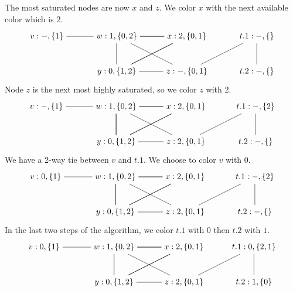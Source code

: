 \documentclass[11pt]{book}
\begin{document}
The most saturated nodes are now $x$ and $z$. We color $x$ with the
next available color which is $2$.
\[
\begin{tikzpicture}[baseline=(current  bounding  box.center)]
\node (v) at (0,0)    {$v:-,\{1\}$};
\node (w) at (3,0)    {$w:1,\{0,2\}$};
\node (x) at (6,0)    {$x:2,\{0,1\}$};
\node (y) at (3,-1.5) {$y:0,\{1,2\}$};
\node (z) at (6,-1.5) {$z:-,\{0,1\}$};
\node (t1) at (9,0)   {$t.1:-,\{\}$};
\node (t2) at (9,-1.5) {$t.2:-,\{\}$};
\draw (t1) to (z);
\draw (t2) to (t1);
\draw (v) to (w);
\foreach \i in {w,x,y}
{
  \foreach \j in {w,x,y}
  {
    \draw (\i) to (\j);
  }
}
\draw (z) to (w);
\draw (z) to (y);
\end{tikzpicture}
\]
Node $z$ is the next most highly saturated, so we color $z$ with $2$.
\[
\begin{tikzpicture}[baseline=(current  bounding  box.center)]
\node (v) at (0,0)   {$v:-,\{1\}$};
\node (w) at (3,0)   {$w:1,\{0,2\}$};
\node (x) at (6,0)   {$x:2,\{0,1\}$};
\node (y) at (3,-1.5)  {$y:0,\{1,2\}$};
\node (z) at (6,-1.5)  {$z:2,\{0,1\}$};
\node (t1) at (9,0)   {$t.1:-,\{2\}$};
\node (t2) at (9,-1.5) {$t.2:-,\{\}$};
\draw (t1) to (z);
\draw (t2) to (t1);
\draw (v) to (w);
\foreach \i in {w,x,y}
{
  \foreach \j in {w,x,y}
  {
    \draw (\i) to (\j);
  }
}
\draw (z) to (w);
\draw (z) to (y);
\end{tikzpicture}
\]
We have a 2-way tie between $v$ and $t.1$. We choose to color $v$ with
$0$.
\[
\begin{tikzpicture}[baseline=(current  bounding  box.center)]
\node (v) at (0,0)   {$v:0,\{1\}$};
\node (w) at (3,0)   {$w:1,\{0,2\}$};
\node (x) at (6,0)   {$x:2,\{0,1\}$};
\node (y) at (3,-1.5)  {$y:0,\{1,2\}$};
\node (z) at (6,-1.5)  {$z:2,\{0,1\}$};
\node (t1) at (9,0)   {$t.1:-,\{2\}$};
\node (t2) at (9,-1.5) {$t.2:-,\{\}$};
\draw (t1) to (z);
\draw (t2) to (t1);
\draw (v) to (w);
\foreach \i in {w,x,y}
{
  \foreach \j in {w,x,y}
  {
    \draw (\i) to (\j);
  }
}
\draw (z) to (w);
\draw (z) to (y);
\end{tikzpicture}
\]
In the last two steps of the algorithm, we color $t.1$ with $0$
then $t.2$ with $1$.
\[
\begin{tikzpicture}[baseline=(current  bounding  box.center)]
\node (v) at (0,0)   {$v:0,\{1\}$};
\node (w) at (3,0)   {$w:1,\{0,2\}$};
\node (x) at (6,0)   {$x:2,\{0,1\}$};
\node (y) at (3,-1.5)  {$y:0,\{1,2\}$};
\node (z) at (6,-1.5)  {$z:2,\{0,1\}$};
\node (t1) at (9,0)   {$t.1:0,\{2,1\}$};
\node (t2) at (9,-1.5) {$t.2:1,\{0\}$};
\draw (t1) to (z);
\draw (t2) to (t1);
\draw (v) to (w);
\foreach \i in {w,x,y}
{
  \foreach \j in {w,x,y}
  {
    \draw (\i) to (\j);
  }
}
\draw (z) to (w);
\draw (z) to (y);
\end{tikzpicture}
\]
\end{document}
